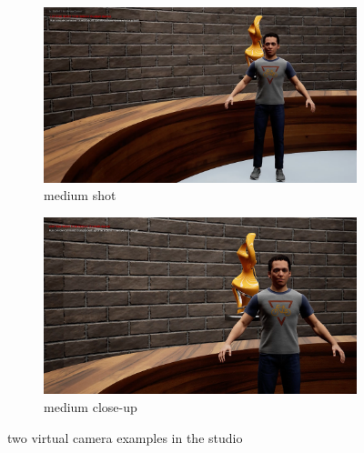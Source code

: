 \documentclass[
  a4paper,  %
  twoside,  %
  bibliography=totoc,
  headsepline,
  cleardoublepage=empty,
  parskip=half,
  draft=false
]{scrbook}
\begin{document}
\begin{figure}[h]
  \centering
  \begin{subfigure}{0.45\textwidth}
    \includegraphics[width=\linewidth]{graphics/images/unreal-engine/camera angles/medium closeup.png}
    \caption{medium shot}
  \end{subfigure}
  \begin{subfigure}{0.45\textwidth}
    \includegraphics[width=\linewidth]{graphics/images/unreal-engine/camera angles/close up.png}
    \caption{medium close-up}
  \end{subfigure}
  \caption{two virtual camera examples in the studio}
  \label{fig:cameras}
\end{figure}
\end{document}

